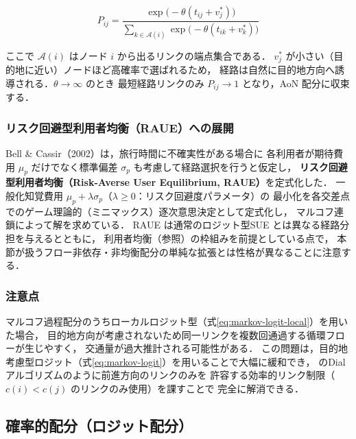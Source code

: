 \begin{equation}
  P_{ij} = \frac{\exp\bigl(-\theta(t_{ij} + v^*_j)\bigr)}{\displaystyle\sum_{k \in \mathcal{A}(i)} \exp\bigl(-\theta(t_{ik} + v^*_k)\bigr)}
  \label{eq:markov-logit}
\end{equation}

ここで $\mathcal{A}(i)$ はノード $i$ から出るリンクの端点集合である．
$v^*_j$ が小さい（目的地に近い）ノードほど高確率で選ばれるため，
経路は自然に目的地方向へ誘導される．$\theta \to \infty$ のとき
最短経路リンクのみ $P_{ij} \to 1$ となり，AoN 配分に収束する．

\subsubsection*{リスク回避型利用者均衡（RAUE）への展開}

Bell \& Cassir（2002）は，旅行時間に不確実性がある場合に
各利用者が期待費用 $\mu_p$ だけでなく標準偏差 $\sigma_p$ も考慮して経路選択を行うと仮定し，
\textbf{リスク回避型利用者均衡（Risk-Averse User Equilibrium, RAUE）}を定式化した\cite{Bell2002}．
一般化知覚費用 $\mu_p + \lambda\sigma_p$（$\lambda \geq 0$：リスク回避度パラメータ）の
最小化を各交差点でのゲーム理論的（ミニマックス）逐次意思決定として定式化し，
マルコフ連鎖によって解を求めている．
RAUE は通常のロジット型SUE とは異なる経路分担を与えるとともに，
利用者均衡（参照）の枠組みを前提としている点で，
本節が扱うフロー非依存・非均衡配分の単純な拡張とは性格が異なることに注意する．

\subsubsection*{注意点}

マルコフ過程配分のうちローカルロジット型（式\eqref{eq:markov-logit-local}）を用いた場合，
目的地方向が考慮されないため同一リンクを複数回通過する循環フローが生じやすく，
交通量が過大推計される可能性がある．
この問題は，目的地考慮型ロジット（式\eqref{eq:markov-logit}）を用いることで大幅に緩和でき，
のDial アルゴリズムのように前進方向のリンクのみを
許容する効率的リンク制限（$c(i) < c(j)$ のリンクのみ使用）を課すことで
完全に解消できる\cite{Akamatsu1996,Dial1971}．

\subsection{確率的配分（ロジット配分）}
\label{subsec:stochastic-assignment}

